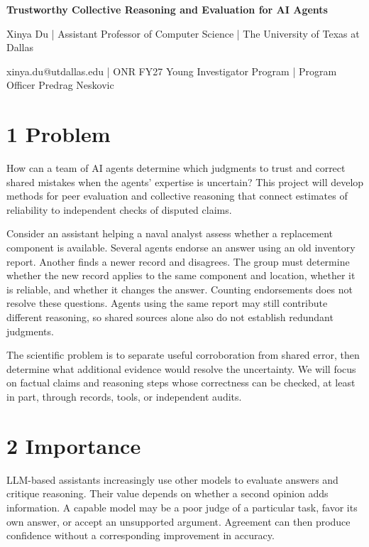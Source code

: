 \documentclass[12pt,letterpaper]{article}
\begin{document}
\begin{center}
{\fontsize{15}{17}\selectfont\bfseries Trustworthy Collective Reasoning and Evaluation for AI Agents\par}
\vspace{4pt}
{\small Xinya Du | Assistant Professor of Computer Science | The University of Texas at Dallas\par}
{\small xinya.du@utdallas.edu | ONR FY27 Young Investigator Program | Program Officer Predrag Neskovic\par}
\end{center}

\section*{1 Problem}
How can a team of AI agents determine which judgments to trust and correct shared mistakes when the agents' expertise is uncertain? This project will develop methods for peer evaluation and collective reasoning that connect estimates of reliability to independent checks of disputed claims.

Consider an assistant helping a naval analyst assess whether a replacement component is available. Several agents endorse an answer using an old inventory report. Another finds a newer record and disagrees. The group must determine whether the new record applies to the same component and location, whether it is reliable, and whether it changes the answer. Counting endorsements does not resolve these questions. Agents using the same report may still contribute different reasoning, so shared sources alone also do not establish redundant judgments.

The scientific problem is to separate useful corroboration from shared error, then determine what additional evidence would resolve the uncertainty. We will focus on factual claims and reasoning steps whose correctness can be checked, at least in part, through records, tools, or independent audits.


\section*{2 Importance}
LLM-based assistants increasingly use other models to evaluate answers and critique reasoning. Their value depends on whether a second opinion adds information. A capable model may be a poor judge of a particular task, favor its own answer, or accept an unsupported argument. Agreement can then produce confidence without a corresponding improvement in accuracy.
\end{document}

